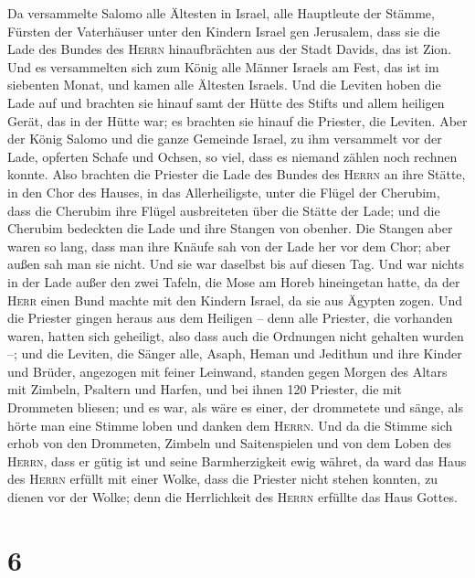  Da versammelte Salomo alle Ältesten in Israel, alle
Hauptleute der Stämme, Fürsten der Vaterhäuser unter den Kindern Israel
gen Jerusalem, dass sie die Lade des Bundes des \textsc{Herrn}
hinaufbrächten aus der Stadt Davids, das ist Zion.  Und es
versammelten sich zum König alle Männer Israels am Fest, das ist im
siebenten Monat,  und kamen alle Ältesten Israels. Und die
Leviten hoben die Lade auf  und brachten sie hinauf samt
der Hütte des Stifts und allem heiligen Gerät, das in der Hütte war; es
brachten sie hinauf die Priester, die Leviten.  Aber der
König Salomo und die ganze Gemeinde Israel, zu ihm versammelt vor der
Lade, opferten Schafe und Ochsen, so viel, dass es niemand zählen noch
rechnen konnte.  Also brachten die Priester die Lade des
Bundes des \textsc{Herrn} an ihre Stätte, in den Chor des Hauses, in das
Allerheiligste, unter die Flügel der Cherubim,  dass die
Cherubim ihre Flügel ausbreiteten über die Stätte der Lade; und die
Cherubim bedeckten die Lade und ihre Stangen von obenher. 
Die Stangen aber waren so lang, dass man ihre Knäufe sah von der Lade
her vor dem Chor; aber außen sah man sie nicht. Und sie war daselbst bis
auf diesen Tag.  Und war nichts in der Lade außer den
zwei Tafeln, die Mose am Horeb hineingetan hatte, da der \textsc{Herr}
einen Bund machte mit den Kindern Israel, da sie aus Ägypten zogen.
 Und die Priester gingen heraus aus dem Heiligen -- denn
alle Priester, die vorhanden waren, hatten sich geheiligt, also dass
auch die Ordnungen nicht gehalten wurden --;  und die
Leviten, die Sänger alle, Asaph, Heman und Jedithun und ihre Kinder und
Brüder, angezogen mit feiner Leinwand, standen gegen Morgen des Altars
mit Zimbeln, Psaltern und Harfen, und bei ihnen 120 Priester, die mit
Drommeten bliesen;  und es war, als wäre es einer, der
drommetete und sänge, als hörte man eine Stimme loben und danken dem
\textsc{Herrn}. Und da die Stimme sich erhob von den Drommeten, Zimbeln
und Saitenspielen und von dem Loben des \textsc{Herrn}, dass er gütig
ist und seine Barmherzigkeit ewig währet, da ward das Haus des
\textsc{Herrn} erfüllt mit einer Wolke,  dass die
Priester nicht stehen konnten, zu dienen vor der Wolke; denn die
Herrlichkeit des \textsc{Herrn} erfüllte das Haus Gottes.

\hypertarget{section-5}{%
\section{6}\label{section-5}}

